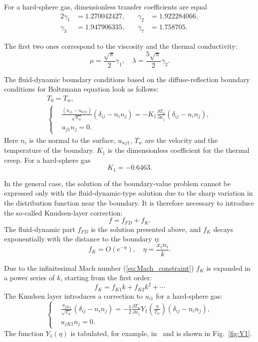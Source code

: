 \documentclass[smallextended, referee]{svjour3} %
\newcommand{\pder}[2][]{\frac{\partial#1}{\partial#2}}
\begin{document}
For a hard-sphere gas, dimensionless transfer coefficients are equal
\begin{alignat*}{2}
	\gamma_1 &= 1.270042427, &\quad \gamma_2 &= 1.922284066, \\
	\gamma_3 &= 1.947906335, &\quad \gamma_7 &= 1.758705.
\end{alignat*}

The first two ones correspond to the viscosity and the thermal conductivity:
\[ \mu = \frac{\sqrt\pi}2\gamma_1, \quad \lambda = \frac{5\sqrt\pi}2\gamma_2. \]

The fluid-dynamic boundary conditions based on the diffuse-reflection boundary conditions
for Boltzmann equation look as follows:
\begin{gather}
	T_0 = T_w, \label{eq:bound:T} \\
	\left\{
	\begin{aligned}
		& \frac{(u_{j1}-u_{wj1})}{\sqrt{T_w}}(\delta_{ij}-n_in_j) = 
			-K_1\pder[T_w]{x_j}(\delta_{ij}-n_in_j), \\
		& u_{j1}n_j = 0.
	\end{aligned}
	\right. \label{eq:bound:v}
\end{gather}
Here \(n_i\) is the normal to the surface, \(u_{wj1}\), \(T_w\) are the velocity and the temperature of the boundary.
\(K_1\) is the dimensionless coefficient for the thermal creep. For a hard-sphere gas
\[ K_1 = -0.6463. \]

In the general case, the solution of the boundary-value problem cannot be expressed only
with the fluid-dynamic-type solution due to the sharp variation in the distribution function
near the boundary.
It is therefore necessary to introduce the so-called Knudsen-layer correction:
\begin{equation}
	f = f_{FD} + f_K.
\end{equation}
The fluid-dynamic part \(f_{FD}\) is the solution presented above,
and \(f_K\) decays exponentially with the distance to the boundary \(\eta\):
\begin{equation}
	f_K = O\left(e^{-\eta}\right), \quad \eta = \frac{x_in_i}k.
\end{equation}

Due to the infinitesimal Mach number (\ref{eq:Mach_constraint}) \(f_K\) is expanded
in a power series of \(k\), starting from the first order:
\[ f_K = f_{K1} k + f_{K2} k ^ 2 + \cdots \]
The Knudsen layer introduces a correction to \(u_{i1}\) for a hard-sphere gas:
\begin{equation}
	\left\{
	\begin{aligned}
		& \frac{u_{jK1}}{\sqrt{T_w}}(\delta_{ij}-n_in_j) = 
			-\frac12\pder[T_w]{x_j} Y_1\left(\frac\eta{T_w}\right) (\delta_{ij}-n_in_j), \\
		& u_{jK1}n_j = 0.
	\end{aligned}
	\right. \label{eq:bound:v_K}
\end{equation}
The function \(Y_1(\eta)\) is tabulated, for example, in~\cite{Sone2002, Sone2007} and is shown in Fig.~\ref{fig:Y1}.
\end{document}
